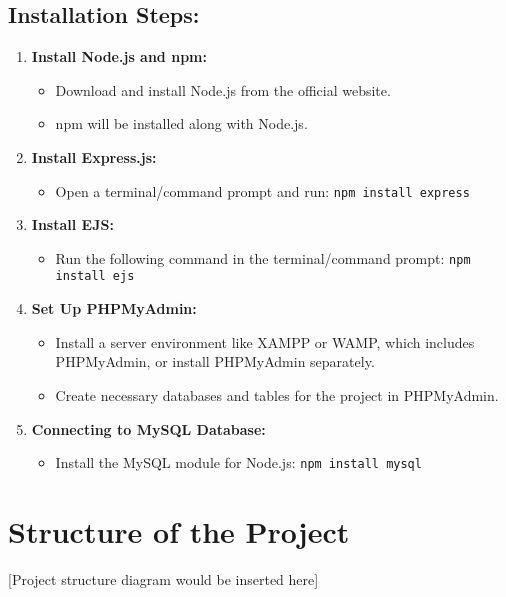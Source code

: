 \documentclass{report}
\begin{document}
\section*{Installation Steps:}
\begin{enumerate}
\item \textbf{Install Node.js and npm:}
\begin{itemize}
\item Download and install Node.js from the official website.
\item npm will be installed along with Node.js.
\end{itemize}

\item \textbf{Install Express.js:}
\begin{itemize}
\item Open a terminal/command prompt and
run: \texttt{npm install express}
\end{itemize}

\item \textbf{Install EJS:}
\begin{itemize}
\item Run the following command in the terminal/command prompt:
\texttt{npm install ejs}
\end{itemize}

\item \textbf{Set Up PHPMyAdmin:}
\begin{itemize}
\item Install a server environment like XAMPP or WAMP, which
includes PHPMyAdmin, or install PHPMyAdmin separately.
\item Create necessary databases and tables for the project in PHPMyAdmin.
\end{itemize}

\item \textbf{Connecting to MySQL Database:}
\begin{itemize}
\item Install the MySQL module for Node.js:
\texttt{npm install mysql}
\end{itemize}
\end{enumerate}

\chapter{Structure of the Project}
[Project structure diagram would be inserted here]
\end{document}
